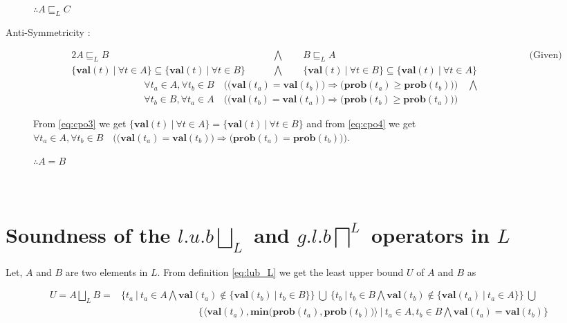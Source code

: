 \documentclass[final,3p, review, times]{util/elsarticle}
\begin{document}
\begin{description}
	$\therefore A\sqsubseteq_L C$
\item[Anti-Symmetricity :] \hfill
\begin{alignat}{2}
    A\sqsubseteq_L B &\qquad\bigwedge\qquad B\sqsubseteq_L A\qquad\qquad\qquad\qquad\qquad\qquad\qquad\qquad\qquad\qquad\text{(Given)}\nonumber\\
    \Big\{\mathbf{val}(t)\ \big|\ \forall t\in A\Big\}\subseteq\Big\{\mathbf{val}(t)\ \big|\ \forall t\in B\Big\} &\qquad\bigwedge\qquad \Big\{\mathbf{val}(t)\ \big|\ \forall t\in B\Big\}\subseteq\Big\{\mathbf{val}(t)\ \big|\ \forall t\in A\Big\}\label{eq:cpo3}
\end{alignat}
\begin{align}
	\forall t_a\in A,\forall t_b\in B\quad\bigg(\Big(\mathbf{val}(t_a)=\mathbf{val}(t_b)\Big)\Rightarrow\Big(\mathbf{prob}(t_a)\geq\mathbf{prob}(t_b)\Big)\bigg)\quad\bigwedge\nonumber\\
	\forall t_b\in B,\forall t_a\in A\quad\bigg(\Big(\mathbf{val}(t_b)=\mathbf{val}(t_a)\Big)\Rightarrow\Big(\mathbf{prob}(t_b)\geq\mathbf{prob}(t_a)\Big)\bigg)\qquad\ \ &\label{eq:cpo4}
\end{align}

	From \ref{eq:cpo3} we get $\Big\{\mathbf{val}(t)\ \big|\ \forall t\in A\Big\}=\Big\{\mathbf{val}(t)\ \big|\ \forall t\in B\Big\}$ and from \ref{eq:cpo4} we get\\
\noindent$\forall t_a\in A,\forall t_b\in B\quad\bigg(\Big(\mathbf{val}(t_a)=\mathbf{val}(t_b)\Big)\Rightarrow\Big(\mathbf{prob}(t_a)=\mathbf{prob}(t_b)\Big)\bigg)$.
	
	$\therefore A=B$
\end{description}









\section{\\Soundness of the $l.u.b \displaystyle\bigsqcup_L$ and $g.l.b \displaystyle\bigsqcap^L$ operators in $L$}
\label{app:concrete_ub}

Let, $A$ and $B$ are two elements in $L$. From definition \ref{eq:lub_L} we get the least upper bound $U$ of $A$ and $B$ as

\begin{align}
U=A\bigsqcup_L B=&\Big\{t_a\ \big|\  t_a\in A\bigwedge \mathbf{val}(t_a)\notin \big\{\mathbf{val}(t_b)\ |\ t_b\in B\big\}\Big\}\ \bigcup\ \Big\{t_b\ \big|\  t_b\in B\bigwedge \mathbf{val}(t_b)\notin \big\{\mathbf{val}(t_a)\ |\ t_a\in A\big\}\Big\}\ \bigcup&\nonumber\\
    &\qquad\qquad\qquad\qquad\Big\{\big\langle\mathbf{val}(t_a),\mathbf{min}\big(\mathbf{prob}(t_a),\mathbf{prob}(t_b)\big)\big\rangle\ \big|\  t_a\in A, t_b\in B\bigwedge \mathbf{val}(t_a)=\mathbf{val}(t_b)\Big\}\label{eq:ub_L1}&
\end{align}
\end{document}

